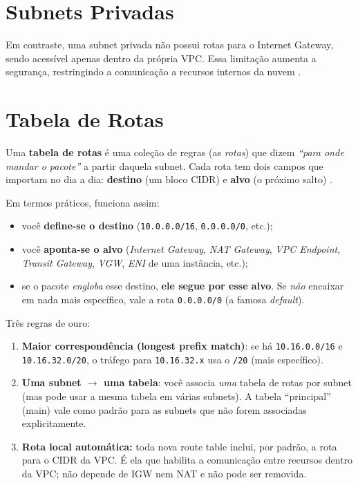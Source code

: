 \section{Subnets Privadas}Em contraste, uma subnet privada não possui rotas para o Internet Gateway, sendo acessível apenas dentro da própria VPC. Essa limitação aumenta a segurança, restringindo a comunicação a recursos internos da nuvem \cite{oracle2024topologia}.

\section{Tabela de Rotas}
Uma \textbf{tabela de rotas} é uma coleção de regras (as \emph{rotas}) que dizem \emph{“para onde mandar o pacote”} a partir daquela subnet. Cada rota tem dois campos que importam no dia a dia: \textbf{destino} (um bloco CIDR) e \textbf{alvo} (o próximo salto) \cite{aws2024rt}.

Em termos práticos, funciona assim: 
\begin{itemize}
  \item você \textbf{define-se o destino} (\texttt{10.0.0.0/16}, \texttt{0.0.0.0/0}, etc.);
  \item você \textbf{aponta-se o alvo} (\emph{Internet Gateway}, \emph{NAT Gateway}, \emph{VPC Endpoint}, \emph{Transit Gateway}, \emph{VGW}, \emph{ENI} de uma instância, etc.);
  \item se o pacote \emph{engloba} esse destino, \textbf{ele segue por esse alvo}. Se \emph{não} encaixar em nada mais específico, vale a rota \texttt{0.0.0.0/0} (a famosa \emph{default}).
\end{itemize}

Três regras de ouro:
\begin{enumerate}
  \item \textbf{Maior correspondência (longest prefix match)}: se há \texttt{10.16.0.0/16} e \texttt{10.16.32.0/20}, o tráfego para \texttt{10.16.32.x} usa o \texttt{/20} (mais específico).
  \item \textbf{Uma subnet $\rightarrow$ uma tabela}: você associa \emph{uma} tabela de rotas por subnet (mas pode usar a mesma tabela em várias subnets). A tabela “principal” (main) vale como padrão para as subnets que não forem associadas explicitamente.
  \item \textbf{Rota local automática:} toda nova route table inclui, por padrão, a rota para o CIDR da VPC. É ela que habilita a comunicação entre recursos dentro da VPC; não depende de IGW nem NAT e não pode ser removida.
\end{enumerate}

